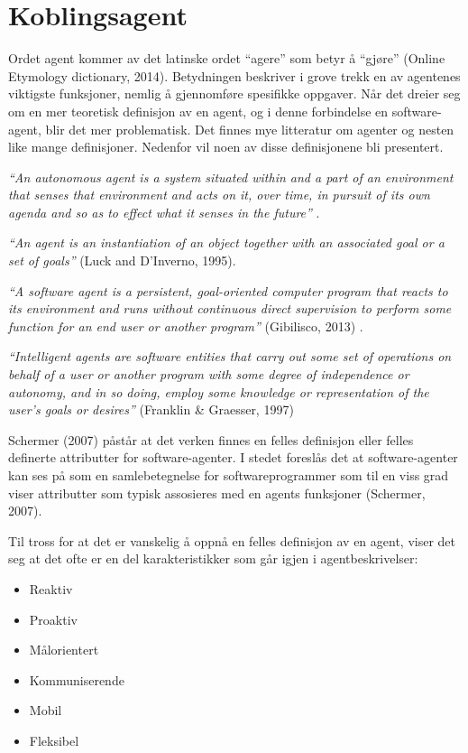 \section{Koblingsagent}
Ordet agent kommer av det latinske ordet ``agere'' som betyr å ``gjøre'' (Online Etymology dictionary, 2014)\cite{website:agent}. Betydningen beskriver i grove trekk en av agentenes viktigste funksjoner, nemlig å gjennomføre spesifikke oppgaver. Når det dreier seg om en mer teoretisk definisjon av en agent, og i denne forbindelse en software-agent, blir det mer problematisk. Det finnes mye litteratur om agenter og nesten like mange definisjoner. Nedenfor vil noen av disse definisjonene bli presentert.

\textit{``An autonomous agent is a system situated within and a part of an environment
that senses that environment and acts on it, over time, in pursuit of its own agenda
and so as to effect what it senses in the future''} \cite{agent}.

\textit{``An agent is an instantiation of an object together with an associated goal or a set of goals''} (Luck and D'Inverno, 1995)\cite{luck_dinverno_agent}.

\textit{``A software agent is a persistent, goal-oriented computer program that reacts to its environment and runs without continuous direct supervision to perform some function for an end user or another program''} (Gibilisco, 2013) \cite{website:gibilesco_agent}.

\textit{``Intelligent agents are software entities that carry out some set of operations on behalf of a user or another program with some degree of independence or autonomy, and in so doing,
employ some knowledge or representation of the user's goals or desires''} (Franklin \& Graesser, 1997)\cite{agent}

Schermer (2007)\cite{schermer} påstår at det verken finnes en felles definisjon eller felles definerte attributter for software-agenter. I stedet foreslås det at software-agenter kan ses på som en samlebetegnelse for softwareprogrammer som til en viss grad viser attributter som typisk assosieres med en agents funksjoner (Schermer, 2007)\cite{schermer}.

Til tross for at det er vanskelig å oppnå en felles definisjon av en agent, viser det seg at det ofte er en del karakteristikker som går igjen i agentbeskrivelser:
\begin{itemize}
\item Reaktiv
\item Proaktiv
\item Målorientert
\item Kommuniserende
\item Mobil
\item Fleksibel
\end{itemize}

